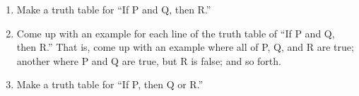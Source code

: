 \probsec{~\ref{sec:truth-tables}}
\begin{enumerate}
    \item Make a truth table for ``If P and Q, then R.''
    \item Come up with an example for each line of the truth table of ``If P and Q, then R.'' That is, come up with an example where all of P, Q, and R are true; another where P and Q are true, but R is false; and so forth.
    \item Make a truth table for ``If P, then Q or R.''
\end{enumerate}
